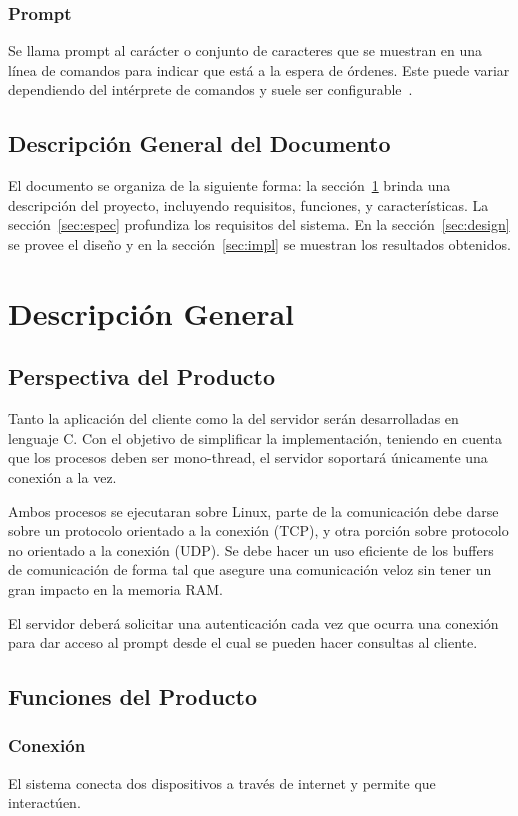\documentclass[11pt]{unc_so2}
\begin{document}
\subsubsection{Prompt}
Se llama prompt al carácter o conjunto de caracteres que se muestran en una
línea de comandos para indicar que está a la espera de órdenes. Este puede
variar dependiendo del intérprete de comandos y suele ser configurable~\cite{prompt}.

\subsection{Descripción General del Documento}
El documento se organiza de la siguiente forma: la sección~\ref{sec:descr}
brinda una descripción del proyecto, incluyendo requisitos, funciones, y
características. La sección~\ref{sec:espec} profundiza los requisitos del
sistema. En la sección~\ref{sec:design} se provee el diseño y en la
sección~\ref{sec:impl} se muestran los resultados obtenidos.

\section{Descripción General}\label{sec:descr}
\subsection{Perspectiva del Producto}
Tanto la aplicación del cliente como la del servidor serán desarrolladas en
lenguaje C. Con el objetivo de simplificar la implementación, teniendo en cuenta
que los procesos deben ser mono-thread, el servidor soportará únicamente una
conexión a la vez.

Ambos procesos se ejecutaran sobre Linux, parte de la comunicación debe darse
sobre un protocolo orientado a la conexión (TCP), y otra porción sobre protocolo
no orientado a la conexión (UDP). Se debe hacer un uso eficiente de los buffers
de comunicación de forma tal que asegure una comunicación veloz sin tener un
gran impacto en la memoria RAM.

El servidor deberá solicitar una autenticación cada vez que ocurra
una conexión para dar acceso al prompt desde el cual se pueden hacer consultas
al cliente.

\subsection{Funciones del Producto}
\subsubsection{Conexión}
El sistema conecta dos dispositivos a través de internet y permite que interactúen.
\end{document}

